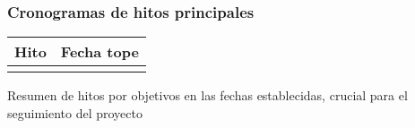 \subsubsection{Cronogramas de hitos principales}

\begin{table}[h]
\begin{tabular}{|l|l|}
\hline
\textbf{Hito} & \textbf{Fecha tope} \\ \hline
              &                     \\ \hline
\end{tabular}
\end{table}

Resumen de hitos por objetivos en las fechas establecidas, crucial para el seguimiento del proyecto